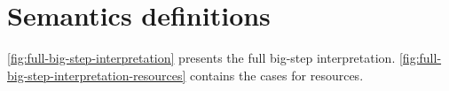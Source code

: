 \section{Semantics definitions}
\label{sec:semant-defin}

% 




\cref{fig:full-big-step-interpretation} presents  the full big-step
interpretation. \cref{fig:full-big-step-interpretation-resources}
contains the cases for resources.

